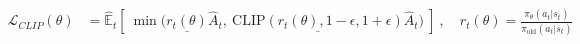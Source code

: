 \begin{align}
\mathcal{L}_{\scriptscriptstyle CLIP}(\theta) &= \hat{\mathbb{E}}_t \left\lbrack\ \min\Big( \underline{r_t(\theta)}\hat{A}_t, \ \underline{\text{CLIP}(r_t(\theta), 1-\epsilon, 1+\epsilon)}\hat{A}_t \Big) \ \right\rbrack \ ,\quad r_t(\theta)=\frac{\pi_\theta(a_t|s_t)}{\pi_{\text{old}}(a_t|s_t)}
\end{align}
